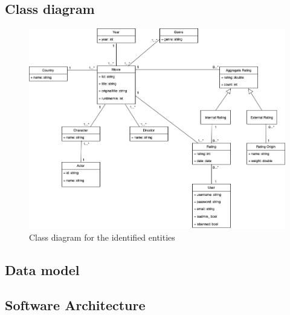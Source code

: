 \documentclass[10pt]{article}
\begin{document}
\subsection{Class diagram}

\begin{figure}[h!]
    \centering
    \includegraphics[width=\textwidth]{figs/class_diagram.png}
    \caption{Class diagram for the identified entities}
    \label{fig:class_diagram}
\end{figure}

\subsection{Data model}

\subsection{Software Architecture}

\end{document}
